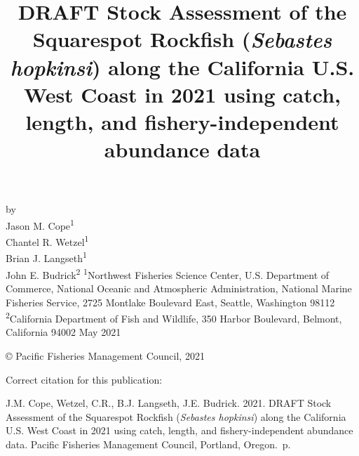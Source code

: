 \documentclass[11pt,
  english,
  a4paper,
]{article}
\date{}
\newcommand{\trTitle}{DRAFT Stock Assessment of the Squarespot Rockfish (\emph{Sebastes hopkinsi}) along the California U.S. West Coast in 2021 using catch, length, and fishery-independent abundance data}
\newcommand{\trYear}{2021}
\newcommand{\trMonth}{May}
\newcommand{\trAuthsBack}{J.M. Cope, Wetzel, C.R., B.J. Langseth, J.E. Budrick}
\newcommand{\trCitation}{
\begin{hangparas}{1em}{1}
\trAuthsBack{}. \trYear{}. \trTitle{}. Pacific Fisheries Management Council, Portland, Oregon. \pageref{LastPage}{}\,p.
\end{hangparas}}
\begin{document}

\renewcommand*{\thefootnote}{\fnsymbol{footnote}}

\small
\thispagestyle{empty}
\noindent
\begin{center}
\title{DRAFT Stock Assessment of the Squarespot Rockfish (\emph{Sebastes hopkinsi}) along the California U.S. West Coast in 2021 using catch, length, and fishery-independent abundance data}
\vspace{1.5cm}
{\Large\textbf{}}
\vfill
by\\
Jason M. Cope\textsuperscript{1}\\
Chantel R. Wetzel\textsuperscript{1}\\
Brian J. Langseth\textsuperscript{1}\\
John E. Budrick\textsuperscript{2}\vfill
\textsuperscript{1}Northwest Fisheries Science Center, U.S. Department of Commerce, National Oceanic and Atmospheric Administration, National Marine Fisheries Service, 2725 Montlake Boulevard East, Seattle, Washington 98112\\
\textsuperscript{2}California Department of Fish and Wildlife, 350 Harbor Boulevard, Belmont, California 94002\vfill
\trMonth{} \trYear{}
\end{center}
\clearpage

\thispagestyle{empty}
\vspace*{\fill}
\begin{center}
\copyright{} Pacific Fisheries Management Council, \trYear{}\\
\end{center}
\par
\bigskip
\noindent
Correct citation for this publication:
\bigskip
\par
\trCitation{}
\clearpage


\tableofcontents\clearpage
\listoffigures \listoftables \clearpage
\label{TRlastRoman}
\clearpage

\newpage
\thispagestyle{empty} %
\end{document}
